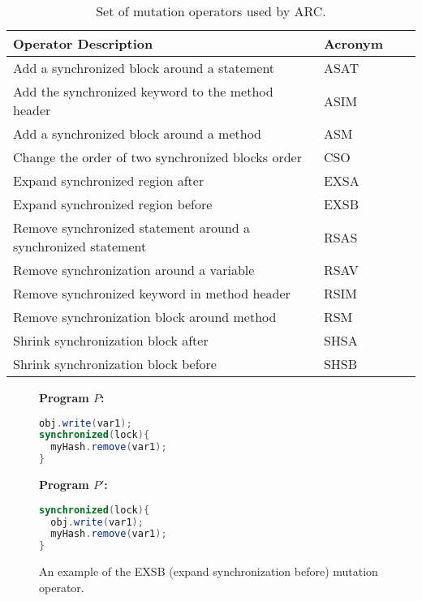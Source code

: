 \documentclass[runningheads,a4paper]{llncs}
\begin{document}
\begin{table}[t!]
\caption{Set of mutation operators used by ARC.}
\begin{center}
\begin{tabular}{|l|l|c|c|}
\hline
\textbf{Operator Description} & \textbf{Acronym} \\
\hline
Add a synchronized block around a statement & ASAT \\
\hline
Add the synchronized keyword to the method header & ASIM \\
\hline
Add a synchronized block around a method & ASM  \\
\hline
Change the order of two synchronized blocks order & CSO  \\
\hline
Expand synchronized region after & EXSA  \\
\hline
Expand synchronized region before & EXSB  \\
\hline
Remove synchronized statement around a synchronized statement & RSAS  \\
\hline
Remove synchronization around a variable & RSAV  \\
\hline
Remove synchronized keyword in method header & RSIM  \\
\hline
Remove synchronization block around method & RSM  \\
\hline
Shrink synchronization block after & SHSA  \\
\hline
Shrink synchronization block before & SHSB  \\
\hline
\end{tabular}
\label{tbl:Operators}
\end{center}
\end{table}

\begin{figure}[t!]
\vspace{2mm}
\begin{minipage}{5cm}
\footnotesize{\textbf{ Program $P$:}}
\begin{lstlisting}[language=Java, morekeywords={synchronize}]
obj.write(var1);
synchronized(lock){
  myHash.remove(var1);
}
\end{lstlisting}
\end{minipage}\hfill
\begin{minipage}{5cm}
\footnotesize{\textbf{ Program $P'$:}}
\begin{lstlisting}[language=Java, morekeywords={synchronize}]
synchronized(lock){
  obj.write(var1);
  myHash.remove(var1);
}
\end{lstlisting}
\end{minipage}
\caption{An example of the EXSB (expand synchronization before) mutation operator.}
\label{fig:EXSB_example}
\end{figure}
\end{document}
